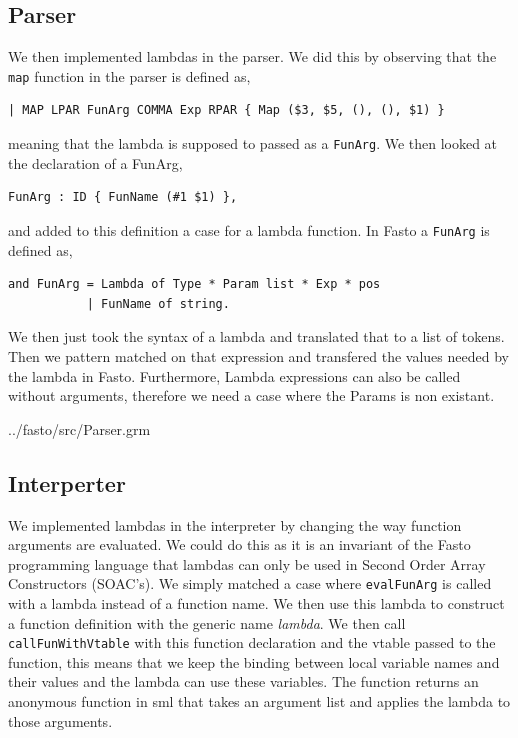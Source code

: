 \documentclass[11pt]{article}
\begin{document}
    \subsection{Parser}
    We then implemented lambdas
    in the parser.  We did this by observing that the \texttt{map} function in
    the parser is defined as,

    \begin{lstlisting}[basicstyle=\small]
| MAP LPAR FunArg COMMA Exp RPAR { Map ($3, $5, (), (), $1) }
    \end{lstlisting}

    meaning that the lambda is supposed to passed as a \texttt{FunArg}.  We then
    looked at the declaration of a FunArg,

    \begin{lstlisting}[basicstyle=\small]
FunArg : ID { FunName (#1 $1) },
    \end{lstlisting}

    and added to this definition a case for a lambda function.  In Fasto a
    \texttt{FunArg} is defined as,

    \begin{lstlisting}[basicstyle=\small]
and FunArg = Lambda of Type * Param list * Exp * pos
           | FunName of string.
    \end{lstlisting}

    We then just took the syntax of a lambda and translated that to a list of
    tokens.  Then we pattern matched on that expression and transfered the
    values needed by the lambda in Fasto. Furthermore, Lambda expressions can also
    be called without arguments, therefore we need a case where the Params is non
    existant.


{../fasto/src/Parser.grm}

\subsection{Interperter}
    We implemented lambdas in the interpreter by changing the way function
    arguments are evaluated.  We could do this as it is an invariant of the
    Fasto programming language that lambdas can only be used in Second Order
    Array Constructors (SOAC's).  We simply matched a case where
    \texttt{evalFunArg} is called with a lambda instead of a function name.  We
    then use this lambda to construct a function definition with the generic
    name \textit{lambda}.  We then call \texttt{callFunWithVtable} with this
    function declaration and the vtable passed to the function, this means that
    we keep the binding between local variable names and their values and the
    lambda can use these variables.  The function returns an anonymous function
    in sml that takes an argument list and applies the lambda to those
    arguments.
\end{document}
